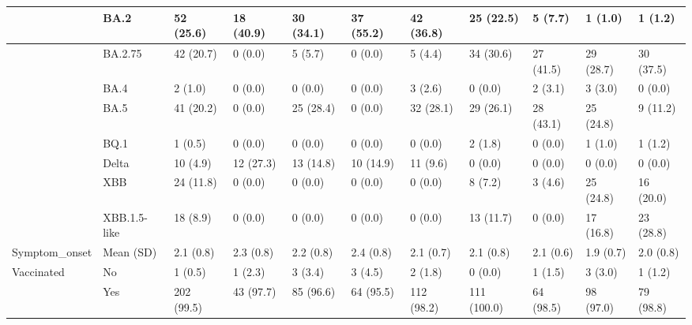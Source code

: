 \begin{tabular}{l|l|l|l|l|l|l|l|l|l|l}
\hline
 & BA.2 & 52 (25.6) & 18 (40.9) & 30 (34.1) & 37 (55.2) & 42 (36.8) & 25 (22.5) & 5 (7.7) & 1 (1.0) & 1 (1.2)\\
\hline
 & BA.2.75 & 42 (20.7) & 0 (0.0) & 5 (5.7) & 0 (0.0) & 5 (4.4) & 34 (30.6) & 27 (41.5) & 29 (28.7) & 30 (37.5)\\
\hline
 & BA.4 & 2 (1.0) & 0 (0.0) & 0 (0.0) & 0 (0.0) & 3 (2.6) & 0 (0.0) & 2 (3.1) & 3 (3.0) & 0 (0.0)\\
\hline
 & BA.5 & 41 (20.2) & 0 (0.0) & 25 (28.4) & 0 (0.0) & 32 (28.1) & 29 (26.1) & 28 (43.1) & 25 (24.8) & 9 (11.2)\\
\hline
 & BQ.1 & 1 (0.5) & 0 (0.0) & 0 (0.0) & 0 (0.0) & 0 (0.0) & 2 (1.8) & 0 (0.0) & 1 (1.0) & 1 (1.2)\\
\hline
 & Delta & 10 (4.9) & 12 (27.3) & 13 (14.8) & 10 (14.9) & 11 (9.6) & 0 (0.0) & 0 (0.0) & 0 (0.0) & 0 (0.0)\\
\hline
 & XBB & 24 (11.8) & 0 (0.0) & 0 (0.0) & 0 (0.0) & 0 (0.0) & 8 (7.2) & 3 (4.6) & 25 (24.8) & 16 (20.0)\\
\hline
 & XBB.1.5-like & 18 (8.9) & 0 (0.0) & 0 (0.0) & 0 (0.0) & 0 (0.0) & 13 (11.7) & 0 (0.0) & 17 (16.8) & 23 (28.8)\\
\hline
Symptom\_onset & Mean (SD) & 2.1 (0.8) & 2.3 (0.8) & 2.2 (0.8) & 2.4 (0.8) & 2.1 (0.7) & 2.1 (0.8) & 2.1 (0.6) & 1.9 (0.7) & 2.0 (0.8)\\
\hline
Vaccinated & No & 1 (0.5) & 1 (2.3) & 3 (3.4) & 3 (4.5) & 2 (1.8) & 0 (0.0) & 1 (1.5) & 3 (3.0) & 1 (1.2)\\
\hline
 & Yes & 202 (99.5) & 43 (97.7) & 85 (96.6) & 64 (95.5) & 112 (98.2) & 111 (100.0) & 64 (98.5) & 98 (97.0) & 79 (98.8)\\
\hline
\end{tabular}
